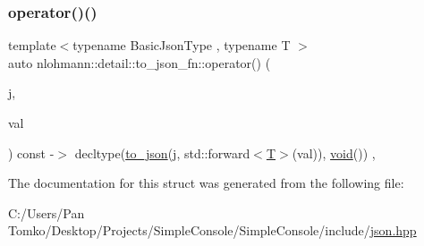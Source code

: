 \subsubsection{\texorpdfstring{operator()()}{operator()()}}
{\footnotesize\ttfamily template$<$typename Basic\+Json\+Type , typename T $>$ \\
auto nlohmann\+::detail\+::to\+\_\+json\+\_\+fn\+::operator() (\begin{DoxyParamCaption}\item[{Basic\+Json\+Type \&}]{j,  }\item[{\mbox{\hyperlink{_keyboard_event_8h_adf1f3edb9115acb0a1e04209b7a9937b}{T}} \&\&}]{val }\end{DoxyParamCaption}) const -\/$>$ decltype(\mbox{\hyperlink{namespacenlohmann_1_1detail_a1a804b98cbe89b7e44b698f2ca860490}{to\+\_\+json}}(j, std\+::forward$<$\mbox{\hyperlink{_keyboard_event_8h_adf1f3edb9115acb0a1e04209b7a9937b}{T}}$>$(val)), \mbox{\hyperlink{namespacenlohmann_1_1detail_a59fca69799f6b9e366710cb9043aa77d}{void}}())
    \hspace{0.3cm}{\ttfamily [inline]}, {\ttfamily [noexcept]}}



The documentation for this struct was generated from the following file\+:\begin{DoxyCompactItemize}
\item 
C\+:/\+Users/\+Pan Tomko/\+Desktop/\+Projects/\+Simple\+Console/\+Simple\+Console/include/\mbox{\hyperlink{json_8hpp}{json.\+hpp}}\end{DoxyCompactItemize}

